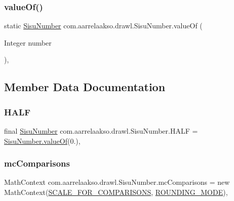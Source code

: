 \subsubsection{\texorpdfstring{value\+Of()}{valueOf()}\hspace{0.1cm}{\footnotesize\ttfamily [4/4]}}
{\footnotesize\ttfamily static \hyperlink{classcom_1_1aarrelaakso_1_1drawl_1_1_sisu_number}{Sisu\+Number} com.\+aarrelaakso.\+drawl.\+Sisu\+Number.\+value\+Of (\begin{DoxyParamCaption}\item[{Integer}]{number }\end{DoxyParamCaption})\hspace{0.3cm}{\ttfamily [static]}, {\ttfamily [protected]}}



\subsection{Member Data Documentation}
\mbox{\label{classcom_1_1aarrelaakso_1_1drawl_1_1_sisu_number_afae3e6d652b8c125dccab3e110d038b0}} 
\subsubsection{\texorpdfstring{H\+A\+LF}{HALF}}
{\footnotesize\ttfamily final \hyperlink{classcom_1_1aarrelaakso_1_1drawl_1_1_sisu_number}{Sisu\+Number} com.\+aarrelaakso.\+drawl.\+Sisu\+Number.\+H\+A\+LF = \hyperlink{classcom_1_1aarrelaakso_1_1drawl_1_1_sisu_number_a2fa3f605463c6f5cb21a08c93289cab3}{Sisu\+Number.\+value\+Of}(0.)\hspace{0.3cm}{\ttfamily [static]}, {\ttfamily [protected]}}

\mbox{\label{classcom_1_1aarrelaakso_1_1drawl_1_1_sisu_number_a09a6e4440f1be870727ad0bc028fc237}} 
\subsubsection{\texorpdfstring{mc\+Comparisons}{mcComparisons}}
{\footnotesize\ttfamily Math\+Context com.\+aarrelaakso.\+drawl.\+Sisu\+Number.\+mc\+Comparisons = new Math\+Context(\hyperlink{classcom_1_1aarrelaakso_1_1drawl_1_1_sisu_number_a9355f25a360283c24625dbdf2a397a0c}{S\+C\+A\+L\+E\+\_\+\+F\+O\+R\+\_\+\+C\+O\+M\+P\+A\+R\+I\+S\+O\+NS}, \hyperlink{classcom_1_1aarrelaakso_1_1drawl_1_1_sisu_number_a98077c422e928740febf571e3f2ec6b5}{R\+O\+U\+N\+D\+I\+N\+G\+\_\+\+M\+O\+DE})\hspace{0.3cm}{\ttfamily [static]}, {\ttfamily [protected]}}



